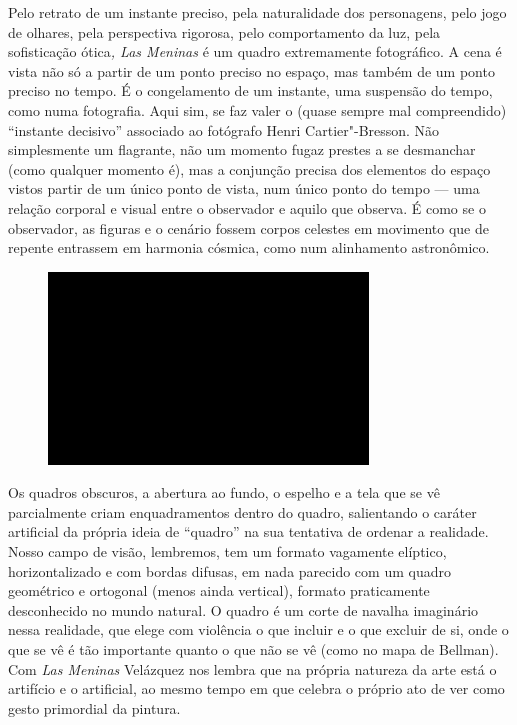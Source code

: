 Pelo retrato de um instante preciso, pela naturalidade dos personagens,
pelo jogo de olhares, pela perspectiva rigorosa, pelo comportamento da
luz, pela sofisticação ótica\emph{, Las Meninas} é um quadro
extremamente fotográfico. A cena é vista não só a partir de um ponto
preciso no espaço, mas também de um ponto preciso no tempo. É o
congelamento de um instante, uma suspensão do tempo, como numa
fotografia. Aqui sim, se faz valer o (quase sempre mal compreendido)
``instante decisivo'' associado ao fotógrafo Henri Cartier"-Bresson. Não
simplesmente um flagrante, não um momento fugaz prestes a se desmanchar
(como qualquer momento é), mas a conjunção precisa dos elementos do
espaço vistos partir de um único ponto de vista, num único ponto do
tempo --- uma relação corporal e visual entre o observador e aquilo que
observa. É como se o observador, as figuras e o cenário fossem corpos
celestes em movimento que de repente entrassem em harmonia cósmica, como
num alinhamento astronômico.

\begin{figure}[!ht]

\centering
 \includegraphics[width=85mm]{./imgs/im1.jpg}
\caption{\tiny{}}

\end{figure}

Os quadros obscuros, a abertura ao fundo, o espelho e a tela que se vê
parcialmente criam enquadramentos dentro do quadro, salientando o
caráter artificial da própria ideia de ``quadro'' na sua tentativa de
ordenar a realidade. Nosso campo de visão, lembremos, tem um formato
vagamente elíptico, horizontalizado e com bordas difusas, em nada
parecido com um quadro geométrico e ortogonal (menos ainda vertical),
formato praticamente desconhecido no mundo natural. O quadro é um corte
de navalha imaginário nessa realidade, que elege com violência o que
incluir e o que excluir de si, onde o que se vê é tão importante quanto
o que não se vê (como no mapa de Bellman). Com \emph{Las Meninas}
Velázquez nos lembra que na própria natureza da arte está o artifício e
o artificial, ao mesmo tempo em que celebra o próprio ato de ver como
gesto primordial da pintura.

